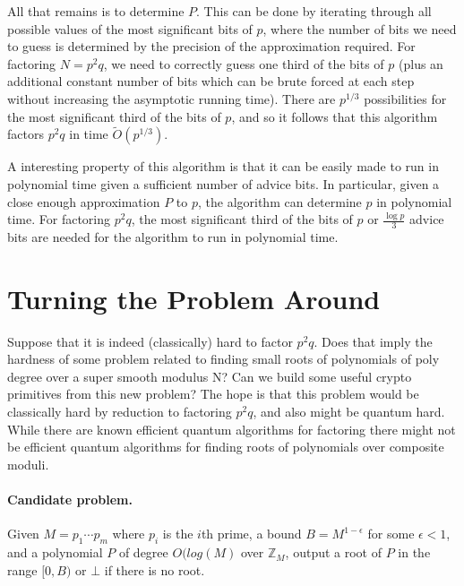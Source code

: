 \documentclass[letterpaper,twocolumn,10pt]{article}
\begin{document}
All that remains is to determine $P$. This can be done by iterating through all possible values of the most significant bits of $p$, where the number of bits we need to guess is determined by the precision of the approximation required. For factoring $N = p^2 q$, we need to correctly guess one third of the bits of $p$ (plus an additional constant number of bits which can be brute forced at each step without increasing the asymptotic running time). There are $p^{1/3}$ possibilities for the most significant third of the bits of $p$, and so it follows that this algorithm factors $p^2 q$ in time $\tilde{O}(p^{1/3})$.

A interesting property of this algorithm is that it can be easily made to run in polynomial time given a sufficient number of advice bits. In particular, given a close enough approximation $P$ to $p$, the algorithm can determine $p$ in polynomial time. For factoring $p^2 q$, the most significant third of the bits of $p$ or $\frac{\log p}{3}$ advice bits are needed for the algorithm to run in polynomial time.

\section{Turning the Problem Around} 
\label{hardness}
Suppose that it is indeed (classically) hard to factor $p^2q$. Does that imply the hardness of some problem related to finding small roots of polynomials of poly degree over a super smooth modulus N? Can we build some useful crypto primitives from this new problem? The hope is that this problem would be classically hard by reduction to factoring $p^2 q$, and also might be quantum hard. While there are known efficient quantum algorithms for factoring there might not be efficient quantum algorithms for finding roots of polynomials over composite moduli. 

\paragraph{Candidate problem.} Given $M = p_1 \cdots p_m$ where $p_i$ is the $i$th prime, a bound $B = M^{1- \epsilon}$ for some $\epsilon < 1$, and a polynomial $P$ of degree $O(log(M)$ over $\mathbb{Z}_M$, output a root of $P$ in the range $[0, B)$ or $\bot$ if there is no root. \\
\end{document}
